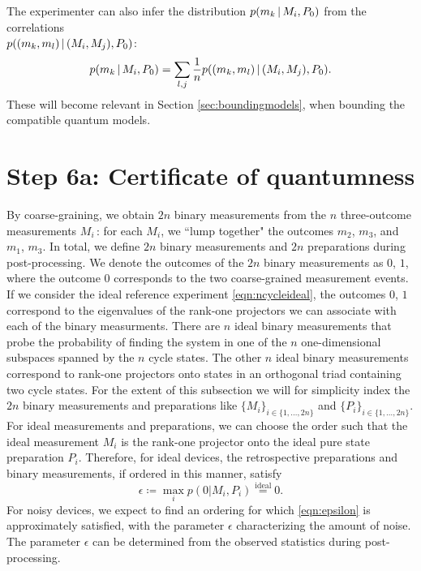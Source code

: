 The experimenter can also infer the distribution $p(m_k\thinspace\vert\thinspace M_i, P_0)$ from the correlations \\$p((m_k,m_l)\thinspace\vert\thinspace(M_i,M_j),P_0)$:
\begin{equation*}
p(m_k \thinspace\vert\thinspace M_i, P_0)=\sum_{l,j}\frac{1}{n}p((m_k,m_l)\thinspace\vert\thinspace (M_i,M_j),P_0).
\end{equation*}
These will become relevant in Section \ref{sec:boundingmodels}, when bounding the compatible quantum models.
\section{Step 6a: Certificate of quantumness}
\label{sec:certifyquant}
By coarse-graining, we obtain $2n$ binary measurements from the $n$ three-outcome measurements $M_i$\,: for each $M_i$, we ``lump together" the outcomes $m_2$, $m_3$, and $m_1$, $m_3$. In total, we define $2n$ binary measurements and $2n$ preparations during post-processing. We denote the outcomes of the $2n$ binary measurements as $0$, $1$, where the outcome $0$ corresponds to the two coarse-grained measurement events. If we consider the ideal reference experiment \ref{eqn:ncycleideal}, the outcomes $0$, $1$ correspond to the eigenvalues of the rank-one projectors we can associate with each of the binary measurments. There are $n$ ideal binary measurements that probe the probability of finding the system in one of the $n$ one-dimensional subspaces spanned by the $n$ cycle states. The other $n$ ideal binary measurements correspond to rank-one projectors onto states in an orthogonal triad containing two cycle states. For the extent of this subsection we will for simplicity index the $2n$ binary measurements and preparations like $\{M_i\}_{i\in\{1,\dots,2n\}}$ and $\{P_i\}_{i\in\{1,\dots,2n\}}$. For ideal measurements and preparations, we can choose the order such that the ideal measurement $M_i$ is the rank-one projector onto the ideal pure state preparation $P_i$. Therefore, for ideal devices, the retrospective preparations and binary measurements, if ordered in this manner, satisfy \begin{equation}
\label{eqn:epsilon}
\epsilon \coloneqq \max_i p(0\vert M_i, P_i)\stackrel{\text{ideal}}{=}0.
\end{equation} 
For noisy devices, we expect to find an ordering for which \ref{eqn:epsilon} is approximately satisfied, with the parameter $\epsilon$ characterizing the amount of noise. The parameter $\epsilon$ can be determined from the observed statistics during post-processing.

